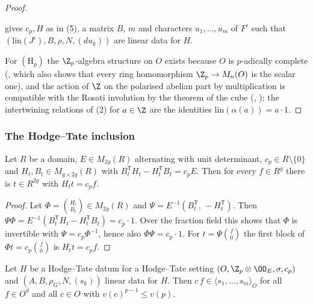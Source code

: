 \begin{proof}
\begin{enumerate}[label=(\arabic*)]
gives $c_p,H$ as in (5), a matrix $B$, $m$ and characters $u_1,\dots,u_m$ of $F^\iota$ such that
$(\mathrm{lin}(J^\iota),B,\rho,N,(du_k))$ are linear data for $H$.
\end{enumerate}
For $(\mathrm H_p)$ the $\Z_p$-algebra structure on $O$ exists because $O$ is $p$-adically complete
(, which also shows that every ring
homomorphism $\Z_p\to M_n(O)$ is the scalar one), and the action of $\Z$ on the polarised abelian part by
multiplication is compatible with the Rosati involution by the theorem of the cube
(, ); the intertwining relations of
(2) for $a\in\Z$ are the identities $\mathrm{lin}(\alpha(a))=a\cdot1$.
\end{proof}

\subsubsection{The Hodge--Tate inclusion}

\begin{lemma}\label{pf:sh-local:htsurj}
Let $R$ be a domain, $E\in M_{2g}(R)$ alternating with unit determinant, $c_p\in R\setminus\{0\}$ and
$H_t,B_t\in M_{g\times2g}(R)$ with $B_t^{\mathsf T}H_t-H_t^{\mathsf T}B_t=c_pE$. Then for every $f\in R^g$ there is
$t\in R^{2g}$ with $H_tt=c_pf$.
\end{lemma}

\begin{proof}
Let $\Phi=\binom{H_t}{B_t}\in M_{2g}(R)$ and $\Psi=E^{-1}(B_t^{\mathsf T},\,-H_t^{\mathsf T})$. Then
$\Psi\Phi=E^{-1}(B_t^{\mathsf T}H_t-H_t^{\mathsf T}B_t)=c_p\cdot1$. Over the fraction field this shows that $\Phi$ is
invertible with $\Psi=c_p\Phi^{-1}$, hence also $\Phi\Psi=c_p\cdot1$. For $t=\Psi\binom f0$ the first block of
$\Phi t=c_p\binom f0$ is $H_tt=c_pf$.
\end{proof}

\begin{proposition}\label{pf:sh-local:lindatHT}
Let $H$ be a Hodge--Tate datum for a Hodge--Tate setting $(O,\Z_p\otimes\OO_E,\sigma,c_p)$ and
$(A,B,\rho_G,N,(s_k))$ linear data for $H$. Then $c\,f\in\langle s_1,\dots,s_m\rangle_O$ for all $f\in O^d$ and all
$c\in O$ with $v(c)^{p-1}\le v(p)$.
\end{proposition}

